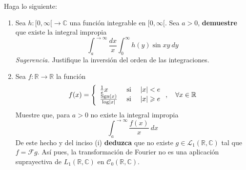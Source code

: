 \documentclass[12pt]{report}
\newcounter{it}
\theoremstyle{largebreak}
\renewcommand{\geq}{\ensuremath{\geqslant}}
\newcommand\abs[1]{\ensuremath{\left|#1\right|}}
\newcommand\cf[3]{\ensuremath{#1:#2\rightarrow#3}}
\newcommand{\fou}[1]{\ensuremath{\mathcal{F}#1}}
\newcommand{\Sgn}[1]{\ensuremath{\textup{Sgn}\left(#1\right)}}
\begin{document}
    \begin{excer}
        Haga lo siguiente:
        \begin{enumerate}
            \item Sea $\cf{h}{[0,\infty[}{\mathbb{C}}$ una función integrable en $[0,\infty[$. Sea $a>0$, \textbf{demuestre} que existe la integral impropia
            \begin{equation*}
                \int_{a}^{ \rightarrow\infty}\frac{dx}{x}\int_0^{\infty}h(y)\sin xy\:dy
            \end{equation*}
            \textit{Sugerencia.} Justifique la inversión del orden de las integraciones.
            \item Sea $\cf{f}{\mathbb{R}}{\mathbb{R}}$ la función
            \begin{equation*}
                f(x)=\left\{
                    \begin{array}{lcr}
                        \frac{1}{e}x & \textup{ si } & \abs{x}<e\\
                        \frac{\Sgn{x}}{\log\abs{x}} & \textup{ si } & \abs{x}\geq e\\
                    \end{array}
                \right.,\quad\forall x\in\mathbb{R}
            \end{equation*}
            Muestre que, para $a>0$ no existe la integral impropia
            \begin{equation*}
                \int_a^{\rightarrow \infty}\frac{f(x)}{x}\:dx
            \end{equation*}
            De este hecho y del inciso (i) \textbf{deduzca} que no existe $g\in\mathcal{L}_1(\mathbb{R},\mathbb{C})$ tal que $f=\fou{g}$. Así pues, la transformación de Fourier no es una aplicación suprayectiva de $L_1(\mathbb{R},\mathbb{C})$ en $\mathcal{C}_0(\mathbb{R},\mathbb{C})$.
        \end{enumerate}
    \end{excer}
\end{document}
